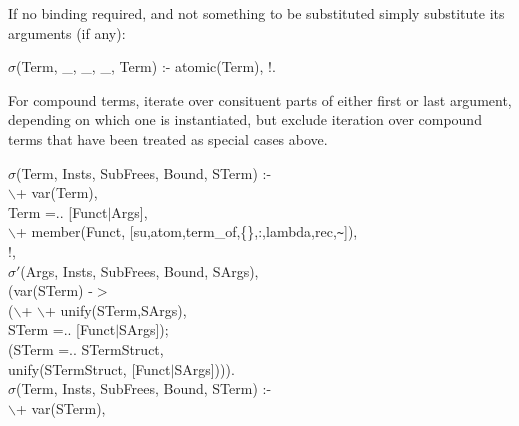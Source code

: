 \documentclass[11pt]{report}
\begin{document}
 If no binding required, and not something to be substituted simply 
 substitute its arguments (if any):
\begin{sf}\begin{tabbing}
$\sigma$(Term, \_\hspace{0.1em}, \_\hspace{0.1em}, \_\hspace{0.1em}, Term) :- atomic(Term), !.
\end{tabbing}\end{sf}

 For compound terms, iterate over consituent parts of either first
 or last argument, depending on which one is instantiated,
 but exclude iteration over compound terms that have been treated as
 special cases above.
\begin{sf}\begin{tabbing}
$\sigma$(Term, Insts, SubFrees, Bound, STerm) :-\\[-0.15ex]
\hspace{2em}$\backslash$+ var(Term),\\[-0.15ex]
\hspace{2em}Term =.. [Funct$\mid$Args],\\[-0.15ex]
\hspace{2em}$\backslash$+ member(Funct, [su,atom,term\_\hspace{0.1em}of,\{\},:,lambda,rec,{\verb`~`}]),\\[-0.15ex]
\hspace{2em}!,\\[-0.15ex]
\hspace{2em}$\sigma'$(Args, Insts, SubFrees, Bound, SArgs),\\[-0.15ex]
\hspace{2em}(var(STerm) -$>$\\[-0.15ex]
\hspace{2em}($\backslash$+ $\backslash$+ unify(STerm,SArgs),\\[-0.15ex]
\hspace{3em}STerm =.. [Funct$\mid$SArgs]);\\[-0.15ex]
\hspace{2em}(STerm =.. STermStruct,\\[-0.15ex]
\hspace{3em}unify(STermStruct, [Funct$\mid$SArgs]))).\\[-0.15ex]
$\sigma$(Term, Insts, SubFrees, Bound, STerm) :-\\[-0.15ex]
\hspace{2em}$\backslash$+ var(STerm),\\[-0.15ex]

\end{tabbing}
\end{sf}
\end{document}
